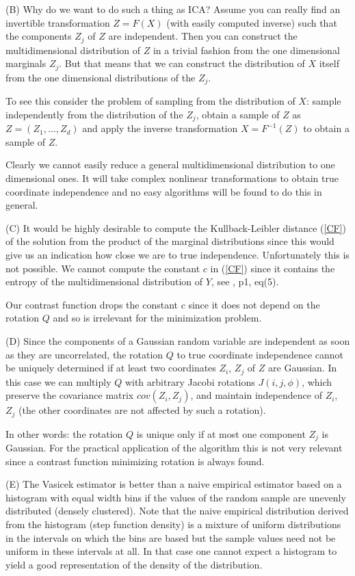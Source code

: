 \documentclass[
10pt,
fleqn,
nosumlimits,
nointlimits,
nonamelimits
]
{article}
\begin{document}
\medskip\noindent
(B) Why do we want to do such a thing as ICA? Assume you can really find an invertible transformation 
$Z=F(X)$ (with easily computed inverse) such that the components $Z_j$ of $Z$ are independent.
Then you can construct the multidimensional distribution of $Z$ in a trivial fashion from the one dimensional
marginals $Z_j$. But that means that we can construct the distribution of $X$ itself from the one dimensional
distributions of the $Z_j$.

To see this consider the problem of sampling from the distribution of $X$: sample independently from the
distribution of the $Z_j$, obtain a sample of $Z$ as $Z=(Z_1,\dots,Z_d)$ and apply the inverse transformation
$X=F^{-1}(Z)$ to obtain a sample of $Z$. 

Clearly we cannot easily reduce a general multidimensional distribution to one dimensional ones.
It will take complex nonlinear transformations to obtain true coordinate independence and no easy algorithms 
will be found to do this in general.


\medskip\noindent
(C) It would be highly desirable to compute the Kullback-Leibler distance (\ref{CF}) of the solution
from the product of the marginal distributions since this would give us an indication how close we are
to true independence. Unfortunately this is not possible. We cannot compute the constant $c$ in 
(\ref{CF}) since it contains the entropy of the multidimensional distribution of $Y$, see \cite{MilFish},
p1, eq(5). 

Our contrast function drops the constant $c$ since it does not depend on the rotation $Q$ and so is
irrelevant for the minimization problem.


\medskip\noindent
(D) Since the components of a Gaussian random variable are independent as soon as they are uncorrelated, the rotation
$Q$ to true coordinate independence cannot be uniquely determined if at least two coordinates $Z_i$, $Z_j$ of $Z$  
are Gaussian. In this case we can multiply $Q$ with arbitrary Jacobi rotations $J(i,j,\phi)$, which preserve
the covariance matrix $cov(Z_i,Z_j)$, and maintain independence of $Z_i$, $Z_j$ (the other coordinates are not affected
by such a rotation).

In other words: the rotation $Q$ is unique only if at most one component $Z_j$ is Gaussian. For the practical
application of the algorithm this is not very relevant since a contrast function minimizing rotation is always found.

\medskip\noindent
(E) The Vasicek estimator is better than a naive empirical estimator based on a histogram with equal width bins
if the values of the random sample are unevenly distributed (densely clustered). Note that the naive empirical
distribution derived from the histogram (step function density) is a mixture of uniform distributions in the 
intervals on which the bins are based but the sample values need not be uniform in these intervals at all.
In that case one cannot expect a histogram to yield a good representation of the density of the distribution.
\end{document}
